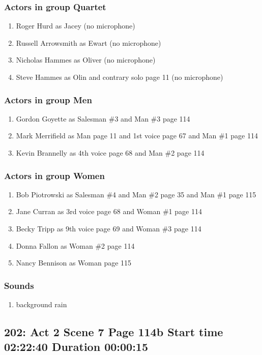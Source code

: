 \subsubsection{Actors in group Quartet}
\begin{enumerate}
\item Roger Hurd as Jacey (no microphone)
\item Russell Arrowsmith as Ewart (no microphone)
\item Nicholas Hammes as Oliver (no microphone)
\item Steve Hammes as Olin and contrary solo page 11 (no microphone)
\end{enumerate}
\subsubsection{Actors in group Men}
\begin{enumerate}
\item Gordon Goyette as Salesman \#3 and Man \#3 page 114
\item Mark Merrifield as Man page 11 and 1st voice page 67 and Man \#1 page 114
\item Kevin Brannelly as 4th voice page 68 and Man \#2 page 114
\end{enumerate}
\subsubsection{Actors in group Women}
\begin{enumerate}
\item Bob Piotrowski as Salesman \#4 and Man \#2 page 35 and Man \#1 page 115
\item Jane Curran as 3rd voice page 68 and Woman \#1 page 114
\item Becky Tripp as 9th voice page 69 and Woman \#3 page 114
\item Donna Fallon as Woman \#2 page 114
\item Nancy Bennison as Woman page 115
\end{enumerate}

\subsubsection{Sounds}
\begin{enumerate}
\item background rain
\end{enumerate}
\subsection{202: Act 2 Scene 7 Page 114b Start time 02:22:40 Duration 00:00:15}

